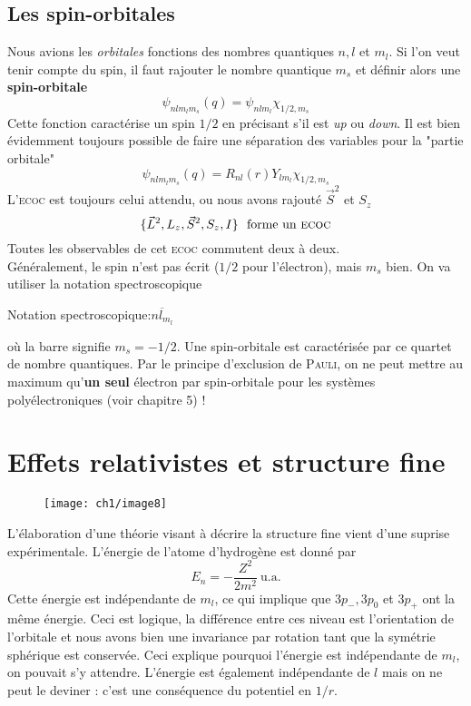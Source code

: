 \subsection{Les spin-orbitales}
Nous avions les \textit{orbitales} fonctions des nombres quantiques $n,l$ et $m_l$. Si l'on veut tenir compte
du spin, il faut rajouter le nombre quantique $m_s$ et définir alors une \textbf{spin-orbitale}
\begin{equation}
\psi_{nlm_lm_s}(q) =  \psi_{nlm_l}\chi_{1/2,m_s}
\end{equation}
Cette fonction caractérise un spin $1/2$ en précisant s'il est \textit{up} ou \textit{down}. Il est bien 
évidemment toujours possible de faire une séparation des variables pour la "partie orbitale"
\begin{equation}
\psi_{nlm_lm_s}(q) =  R_{nl}(r)Y_{lm_l}\chi_{1/2,m_s}
\end{equation}
L'\textsc{ecoc} est toujours celui attendu, ou nous avons rajouté $\vec{S}^2$ et $S_z$
\begin{equation}
\{\vec{L}^2, L_z, \vec{S}^2, S_z, I\}\ \text{ forme un \textsc{ecoc}}
\end{equation}
Toutes les observables de cet \textsc{ecoc} commutent deux à deux. \\

Généralement, le spin n'est pas écrit ($1/2$ pour l'électron), mais $m_s$ bien. On va utiliser la notation 
spectroscopique 
\begin{center}
Notation spectroscopique\quad :\quad $\overline{nl_{m_l}}$
\end{center}
où la barre signifie $m_s=-1/2$. Une spin-orbitale est caractérisée par ce quartet de nombre quantiques. Par
le principe d'exclusion de \textsc{Pauli}, on ne peut mettre au maximum qu'\textbf{un seul} électron par 
spin-orbitale pour les systèmes polyélectroniques (voir chapitre 5) !




\section{Effets relativistes et structure fine}
	\begin{wrapfigure}[20]{l}{8cm}
	\vspace{-8mm}
	\texttt{[image: ch1/image8]}
	\end{wrapfigure}
L'élaboration d'une théorie visant à décrire la structure fine vient d'une suprise expérimentale. L'énergie de
l'atome d'hydrogène est donné par
\begin{equation}
E_n = -\frac{Z^2}{2m^2}\ \text{u.a.}
\end{equation}
Cette énergie est indépendante de $m_l$, ce qui implique que $3p_-, 3p_0$ et $3p_+$ ont la même énergie. Ceci
est logique, la différence entre ces niveau est l’orientation de l'orbitale et nous avons bien une invariance
par rotation tant que la symétrie sphérique est conservée. Ceci explique pourquoi l'énergie est indépendante
de $m_l$, on pouvait s'y attendre. L'énergie est également indépendante de $l$ mais on ne peut le deviner : 
c'est une conséquence du potentiel en $1/r$.\\

